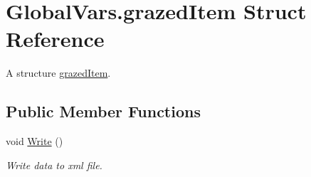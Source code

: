 \hypertarget{struct_global_vars_1_1grazed_item}{}\section{Global\+Vars.\+grazed\+Item Struct Reference}
\label{struct_global_vars_1_1grazed_item}


A structure \mbox{\hyperlink{struct_global_vars_1_1grazed_item}{grazed\+Item}}.  


\subsection*{Public Member Functions}
\begin{DoxyCompactItemize}
\item 
\mbox{\label{struct_global_vars_1_1grazed_item_a5097dcb4a0b6ed484dd0567e058ae9a0}} 
void \mbox{\hyperlink{struct_global_vars_1_1grazed_item_a5097dcb4a0b6ed484dd0567e058ae9a0}{Write}} ()
\begin{DoxyCompactList}\small\item\em Write data to xml file. \end{DoxyCompactList}\end{DoxyCompactItemize}
